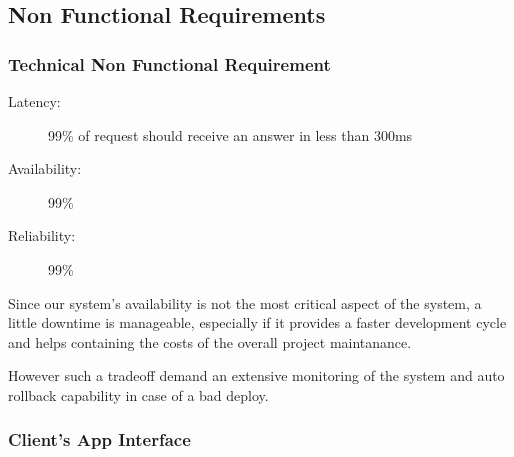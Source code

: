 \documentclass[11pt]{article} %
\begin{document}
\subsection{Non Functional Requirements}

\subsubsection{Technical Non Functional Requirement}

\begin{description}
	\item[Latency:] 99\% of request should receive an answer in less than 300ms
	\item[Availability:] 99\%
	\item[Reliability:] 99\%
\end{description}

Since our system's availability is not the most critical aspect of the system, a little downtime is manageable, especially if it provides a faster development cycle and helps containing the costs of the overall project maintanance. 
 
However such a tradeoff demand an extensive monitoring of the system and auto rollback capability in case of a bad deploy.

\subsubsection{Client's App Interface}
\end{document}
